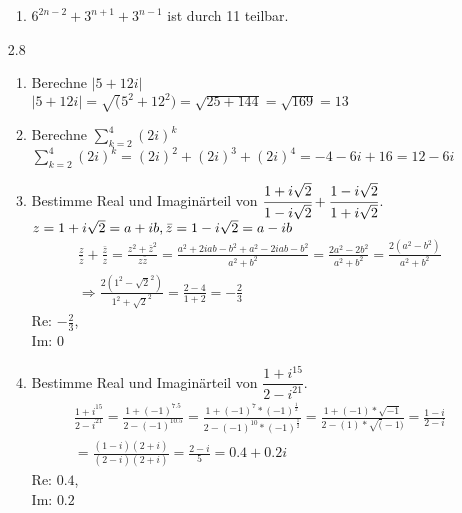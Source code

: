 \documentclass[12pt,letterpaper]{article}
\begin{document}
\begin{enumerate}
\begin{enumerate}
\item $6^{2n-2}+3^{n+1}+3^{n-1}$ ist durch 11 teilbar.
\end{enumerate}
\item [2.8]
\begin{enumerate}
\item Berechne $|5+12i|$\\
$|5+12i| = \sqrt(5^2+12^2) = \sqrt{25+144} = \sqrt{169} = 13$
\item Berechne $\sum\limits_{k=2}^{4}(2i)^k$\\
$\sum\limits_{k=2}^{4}(2i)^k = (2i)^2+(2i)^3+(2i)^4 = -4-6i+16 = 12-6i$
\item Bestimme Real und Imaginärteil von $\cfrac{1+i\sqrt{2}}{1-i\sqrt{2}}+\cfrac{1-i\sqrt{2}}{1+i\sqrt{2}}$.\\
$z = 1+i\sqrt{2} = a+ib,\\
\bar{z} = 1-i\sqrt{2} = a-ib$
\begin{align*}
\frac{z}{\bar{z}}+\frac{\bar{z}}{z} = \frac{z^2+\bar{z}^2}{z\bar{z}} = \frac{a^2+2iab-b^2+a^2-2iab-b^2}{a^2+b^2} = \frac{2a^2-2b^2}{a^2+b^2} = \frac{2(a^2-b^2)}{a^2+b^2}\\
\Rightarrow\frac{2(1^2-\sqrt{2}^2)}{1^2+\sqrt{2}^2}=\frac{2-4}{1+2} = -\frac{2}{3}
\end{align*}
Re: $-\frac{2}{3}$,\\
Im: $0$
\item Bestimme Real und Imaginärteil von $\dfrac{1+i^{15}}{2-i^{21}}$.
\begin{align*}
\frac{1+i^{15}}{2-i^{21}} = \frac{1+(-1)^{7.5}}{2-(-1)^{10.5}} = \frac{1+(-1)^7*(-1)^{\frac{1}{2}}}{2-(-1)^{10}*(-1)^{\frac{1}{2}}} = \frac{1+(-1)*\sqrt{-1}}{2-(1)*\sqrt(-1)} = \frac{1-i}{2-i}\\
=\frac{(1-i)(2+i)}{(2-i)(2+i)} = \frac{2-i}{5} = 0.4+0.2i
\end{align*}
Re: $0.4$,\\
Im: $0.2$
\end{enumerate}
\end{enumerate}
\end{document}
